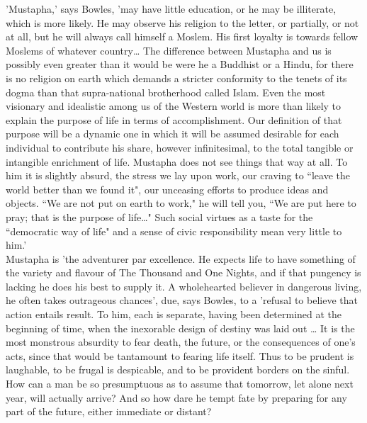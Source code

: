 \documentclass[10pt, twoside,openright]{book}
\begin{document}
'Mustapha,' says Bowles, 'may have little education, or he may be illiterate, which is more likely. He may observe his religion to the letter, or partially, or not at all, but he will always call himself a Moslem. His first loyalty is towards fellow Moslems of whatever country\ldots{} The difference between Mustapha and us is possibly even greater than it would be were he a Buddhist or a Hindu, for there is no religion on earth which demands a stricter conformity to the tenets of its dogma than that supra\hyp{}national brotherhood called Islam. Even the most visionary and idealistic among us of the Western world is more than likely to explain the purpose of life in terms of accomplishment. Our definition of that purpose will be a dynamic one in which it will be assumed desirable for each individual to contribute his share, however infinitesimal, to the total tangible or intangible enrichment of life. Mustapha does not see things that way at all. To him it is slightly absurd, the stress we lay upon work, our craving to ``leave the world better than we found it", our unceasing efforts to produce ideas and objects. ``We are not put on earth to work," he will tell you, ``We are put here to pray; that is the purpose of life\ldots{}" Such social virtues as a taste for the ``democratic way of life" and a sense of civic responsibility mean very little to him.' \\

Mustapha is 'the adventurer par excellence. He expects life to have something of the variety and flavour of The Thousand and One Nights, and if that pungency is lacking he does his best to supply it. A wholehearted believer in dangerous living, he often takes outrageous chances', due, says Bowles, to a 'refusal to believe that action entails result. To him, each is separate, having been determined at the beginning of time, when the inexorable design of destiny was laid out \ldots{} It is the most monstrous absurdity to fear death, the future, or the consequences of one's acts, since that would be tantamount to fearing life itself. Thus to be prudent is laughable, to be frugal is despicable, and to be provident borders on the sinful. How can a man be so presumptuous as to assume that tomorrow, let alone next year, will actually arrive? And so how dare he tempt fate by preparing for any part of the future, either immediate or distant? \\
\end{document}
